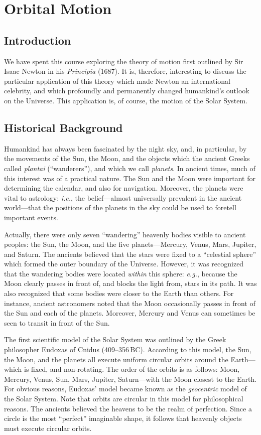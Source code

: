 \section{Orbital Motion}
\subsection{Introduction}
We have spent this course exploring the theory of motion first outlined by
Sir Isaac Newton in his {\em Principia} (1687). It is, therefore, 
interesting to discuss
the particular application of this theory which made Newton
an international celebrity, and which profoundly and permanently changed 
humankind's outlook on the Universe. This application is, of course, the motion of the Solar System. 

\subsection{Historical Background}
Humankind has always been fascinated by the night sky, and, in particular, by the movements of
the Sun, the Moon, and the objects which the ancient Greeks called {\em plantai} (``wanderers''), and which we call
{\em planets}. In ancient times, much of this interest was of a practical nature. The Sun and the
Moon were important for determining the calendar, and also for navigation. Moreover, the
planets were vital to astrology: {\em i.e.}, the belief---almost universally prevalent in the ancient world---that
the positions of the planets in the sky could be used to foretell important events.

Actually, there were only seven ``wandering'' heavenly bodies
 visible to  ancient peoples: the Sun, the Moon, and the five
planets---Mercury, Venus, Mars, Jupiter, and Saturn. The ancients believed that the stars were fixed
to a ``celestial sphere'' which formed the outer boundary of the Universe. However, it was recognized
that the wandering bodies were located {\em within} this sphere: {\em e.g.},  because the Moon clearly
passes in front of, and blocks the light from, stars in its path. 
It was also recognized that some  bodies were closer to the Earth
than others. For instance,  ancient astronomers
 noted that the Moon occasionally passes in front of the Sun and
each of the planets. Moreover, Mercury and Venus can sometimes be seen to transit in front of the Sun.

The first scientific model of the Solar System was outlined by the Greek philosopher
Eudoxas of Cnidus (409--356\,BC). According to this model,
the Sun, the Moon, and the planets all execute uniform circular orbits around the Earth---which is
fixed, and non-rotating.
 The order of the orbits is as follows: Moon, Mercury, Venus, Sun, Mars, Jupiter, Saturn---with 
the Moon closest to the Earth. For obvious reasons, Eudoxas' model became known as the
{\em geocentric} model of the Solar System. Note that  orbits are circular in this
model for philosophical reasons. The ancients believed the heavens to be the realm of perfection.
Since a circle is the most ``perfect'' imaginable shape, it follows that heavenly objects must execute
circular orbits.

